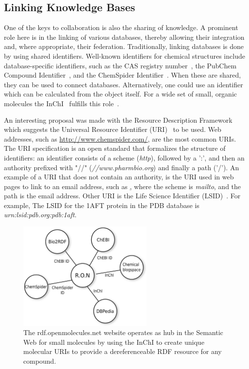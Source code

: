\documentclass[11pt]{book}
\begin{document}
\subsection{Linking Knowledge Bases}

One of the keys to collaboration is also the sharing of knowledge.
A prominent role here is in the linking of various databases,
thereby allowing their integration and, where appropriate, their federation.
Traditionally, linking databases is done by using shared identifiers.
Well-known identifiers for chemical structures include
database-specific identifiers, such as the CAS registry number~\cite{url:casnumber},
the PubChem Compound Identifier~\cite{url:pubchemcid},
and the ChemSpider Identifier~\cite{url:chemspider}.
When these are shared, they can be used to connect databases.
Alternatively, one could use an identifier which can be calculated
from the object itself. For a wide set of small, organic molecules
the InChI~\cite{Stein2003} fulfills this role~\cite{Coles2005}.

An interesting proposal was made with the Resource Description
Framework~\cite{Carroll:04:RDF} which suggests the Universal
Resource Identifier (URI)~\cite{rfc3986} to be used.
Web addresses, such as \url{http://www.chemspider.com/}, are
the most common URIs. The URI specification is an open
standard that formalizes the structure of identifiers:
an identifier consists of a scheme (\textit{http}),
followed by a ':', and then an authority prefixed with
"//" (\textit{//www.pharmbio.org}) and
finally a path ('/'). An example of a URI that does not contain an authority,
is the URI used in web pages to link to an email address, such as
\href{mailto:bioclipse-devel@lists.sourceforge.net}, where the
scheme is \textit{mailto}, and the path is the email address.
Other URI is the Life Science Identifier (LSID)~\cite{Clark2004}.
For example, The LSID for the 1AFT protein in the
PDB database is \textit{urn:lsid:pdb.org:pdb:1aft}.

\begin{figure}[bt]
\begin{center}
\includegraphics[width=0.6\textwidth]{graphics/ons.pdf}
\end{center}
\caption{The rdf.openmolecules.net website operates as hub
in the Semantic Web for small molecules by using the InChI
to create unique molecular URIs to provide a dereferenceable
RDF resource for any compound.}
\label{fig:ons}
\end{figure}
\end{document}
